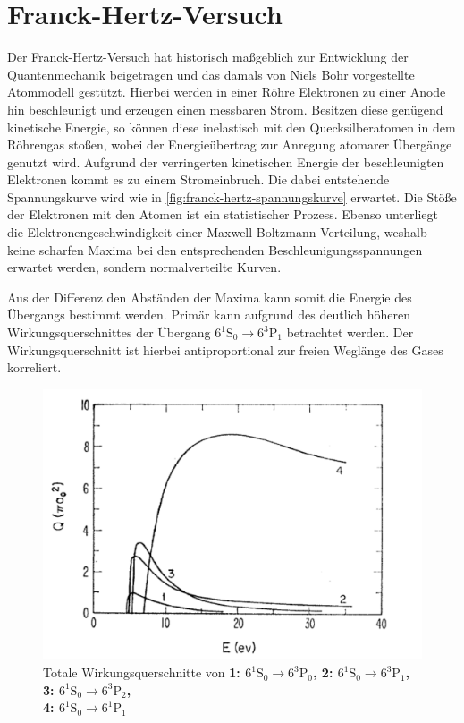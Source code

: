\section{Franck-Hertz-Versuch}\label{sec:franck-hertz}
Der Franck-Hertz-Versuch hat historisch maßgeblich zur Entwicklung 
der Quantenmechanik beigetragen und das damals von Niels Bohr vorgestellte 
Atommodell gestützt. Hierbei werden in einer Röhre Elektronen zu einer Anode hin 
beschleunigt und erzeugen einen messbaren 
Strom. Besitzen diese genügend kinetische Energie, so können 
diese inelastisch mit den Quecksilberatomen in dem Röhrengas stoßen, 
wobei der Energieübertrag zur Anregung atomarer Übergänge genutzt wird. 
Aufgrund der verringerten kinetischen Energie der beschleunigten Elektronen 
kommt es zu einem Stromeinbruch. Die dabei entstehende Spannungskurve wird 
wie in \cref{fig:franck-hertz-spannungskurve} erwartet. Die Stöße der Elektronen 
mit den Atomen ist ein statistischer Prozess. Ebenso unterliegt die Elektronengeschwindigkeit
einer Maxwell-Boltzmann-Verteilung, weshalb keine scharfen Maxima 
bei den entsprechenden Beschleunigungsspannungen erwartet werden, sondern 
normalverteilte Kurven.

Aus der Differenz den Abständen der Maxima kann somit die 
Energie des Übergangs bestimmt werden. Primär kann 
aufgrund des deutlich höheren Wirkungsquerschnittes der Übergang
${}6^1\mathrm S_0\rightarrow 6^3\mathrm P_1$ betrachtet werden. Der Wirkungsquerschnitt ist 
hierbei antiproportional zur freien Weglänge des Gases korreliert. 


\begin{figure}[h]
    \centering
    \includegraphics[width=0.6\linewidth]{../figs/querschnitt}
    \caption{Totale Wirkungsquerschnitte von \bf 1: $6^1\mathrm S_0\rightarrow 6^3\mathrm P_0$,
    \bf 2: $6^1\mathrm S_0\rightarrow 6^3\mathrm P_1$, 
    \bf 3: $6^1\mathrm S_0\rightarrow 6^3\mathrm P_2$,\\
    \bf 4: $6^1\mathrm S_0\rightarrow 6^1\mathrm P_1$ \cite{skript}}
    \label{fig:wirkungsquerschnitte}
\end{figure}

